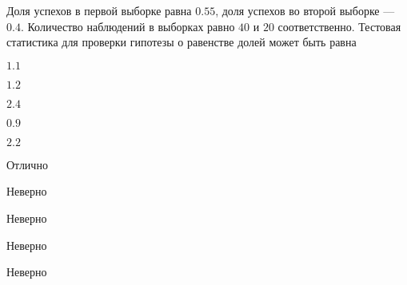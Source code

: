 
\begin{question}
Доля успехов в первой выборке равна \(0.55\), доля успехов во второй
выборке — \(0.4\). Количество наблюдений в выборках равно \(40\) и
\(20\) соответственно. Тестовая статистика для проверки гипотезы о
равенстве долей может быть равна
\begin{answerlist}
  \item \(1.1\)
  \item \(1.2\)
  \item \(2.4\)
  \item \(0.9\)
  \item \(2.2\)
\end{answerlist}
\end{question}

\begin{solution}
\begin{answerlist}
  \item Отлично
  \item Неверно
  \item Неверно
  \item Неверно
  \item Неверно
\end{answerlist}
\end{solution}

